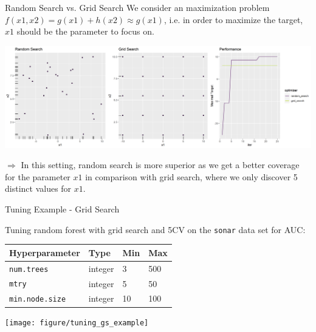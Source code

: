 \begin{vbframe}{Random Search vs. Grid Search}
	We consider an maximization problem $f(x1,x2)=g(x1)+h(x2)\approx g(x1)$, i.e. in order to maximize the target, $x1$ should be the parameter to focus on.
	\vspace{0.5cm}
	\begin{knitrout}\scriptsize
		\color{fgcolor}
		
		{\centering \includegraphics[width=\textwidth]{figure/rs_gs_simulation_plot} 
		}
		
	\end{knitrout}
	$\Rightarrow$ In this setting, random search is more superior as we get a better coverage for the parameter $x1$ in comparison with grid search, where we only discover 5 distinct values for $x1$.
\end{vbframe}

\begin{vbframe}{Tuning Example - Grid Search}
	
	Tuning random forest with grid search and 5CV on the \texttt{sonar} data set for AUC:
	
	\begin{footnotesize}
		\begin{center}
			\begin{tabular}{|l|l|l|l}
				Hyperparameter          &  Type     & Min & Max \\
				\hline
				\texttt{num.trees}     & integer  & 3 & 500 \\
				\texttt{mtry}          & integer  & 5 & 50  \\
				\texttt{min.node.size} & integer  & 10 & 100\\
			\end{tabular}
		\end{center}
	\end{footnotesize}
	
	\begin{knitrout}\scriptsize
		\color{fgcolor}
		
		{\centering \texttt{[image: figure/tuning\_gs\_example]}
		}
		
		
	\end{knitrout}
	
\end{vbframe}


